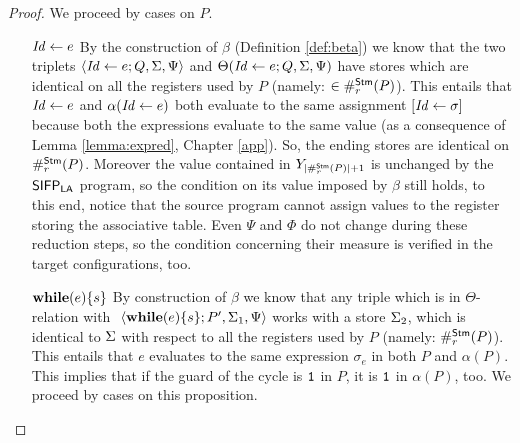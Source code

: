 \begin{proof}

  We proceed by cases on $P$.
  \begin{itemize}
    \item[$\mathit{Id} \leftarrow e$] By the construction of $\beta$
    (Definition \ref{def:beta})
     we know that the two triplets
    $\langle \mathit{Id} \leftarrow e;Q, \Sigma, \Psi\rangle$ and
    $\Theta(\mathit{Id} \leftarrow e;Q, \Sigma, \Psi)$ have stores which
    are identical on all the registers used by $P$ (namely: $\in \#_r^{\mathsf{Stm}}(P)$).
    This entails that
    $\mathit{Id} \leftarrow e$ and $\alpha(\mathit{Id} \leftarrow e)$ both evaluate to the same assignment
    $[\mathit{Id} \leftarrow \sigma]$ because both the expressions evaluate to the same value
    (as a consequence of Lemma \ref{lemma:expred}, Chapter \ref{app}).
    So, the ending stores are identical on $\#_r^{\mathsf{Stm}}(P)$.
    Moreover the value contained in $Y_{|\#_r^{\mathsf{Stm}}(P)|+1}$ is unchanged by
    the $\mathsf{SIFP_{{\mathsf{LA}}}}$ program, so the condition on its value imposed by $\beta$
    still holds, to this end, notice that the source program cannot
    assign values to the register storing the associative table. Even
    $\Psi$ and $\Phi$ do not change during these reduction steps, so the condition
    concerning their measure is verified in the target configurations, too.
    \item[$\mathbf{while}(e)\{s\}$] \sloppy By construction of $\beta$ we know that
    any triple which is in
    $\Theta$-relation with $~{\langle \while e s; P',\linebreak \store_1, \Psi\rangle}$ works with
    a store $\Sigma_2$, which
    is identical to $\Sigma$ with respect to all the registers used by $P$
    (namely: $\#_r^{\mathsf{Stm}}(P)$).
    This entails that
    $e$ evaluates to the same expression $\sigma_e$ in both $P$ and $\alpha(P)$.
    This implies that if the guard of the cycle is $\mathtt{1}$ in $P$, it is $\mathtt{1}$ in
    $\alpha(P)$, too. We proceed by cases on this proposition.

\end{itemize}
\end{proof}
